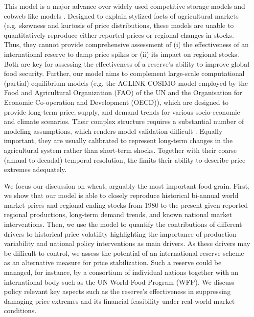 \documentclass[12pt]{article}
\begin{document}
This model is a major advance over widely used competitive storage models \cite{CAF11} and cobweb like models \cite{MIT12}. Designed to explain stylized facts of agricultural markets (e.g. skewness and kurtosis of price distributions, these models are unable to quantitatively reproduce either reported prices or regional changes in stocks. Thus, they cannot provide comprehensive assessment of (i) the effectiveness of an international reserve to damp price spikes or (ii) its impact on regional stocks. Both are key for assessing the effectiveness of a reserve's ability to improve global food security. Further, our model aims to complement large-scale computational (partial) equilibrium models (e.g. the AGLINK-COSIMO model \cite{OECD15} employed by the Food and Agricultural Organization (FAO) of the UN and the Organisation for Economic Co-operation and Development  (OECD)), which are designed to provide long-term price, supply, and demand trends for various socio-economic and climate scenarios. Their complex structure requires a substantial number of modeling assumptions, which renders model validation difficult \cite{VAL07}. Equally important, they are usually calibrated to represent long-term changes in the agricultural system rather than short-term shocks. Together with their coarse (annual to decadal) temporal resolution, the limits their ability to describe price extremes adequately. 


We focus our discussion on wheat, arguably the most important food grain. First, we show that our model is able to closely reproduce historical bi-annual world market prices and regional ending stocks from 1980 to the present given reported regional productions, long-term demand trends, and known national market interventions. Then, we use the model to quantify the contributions of different drivers to historical price volatility highlighting the importance of production variability and national policy interventions as main drivers. As these drivers may be difficult to control, we assess the potential of an international reserve scheme as an alternative measure for price stabilization. Such a reserve could be managed, for instance, by a consortium of individual nations together with an international body such as the UN World Food Program (WFP). We discuss policy relevant key aspects such as the reserve's effectiveness in suppressing damaging price extremes and its financial feasibility under real-world market conditions.
\end{document}
